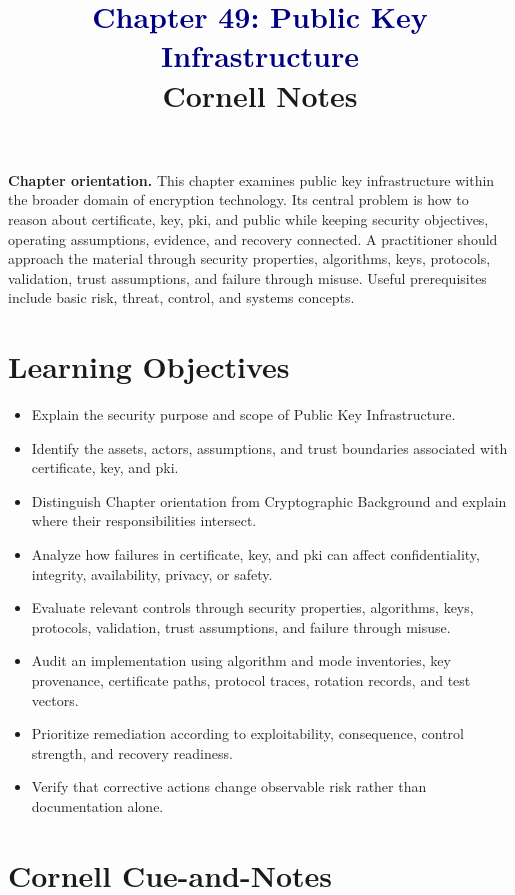 \documentclass[11pt]{article}
\title{\textcolor{Navy}{Chapter 49: Public Key Infrastructure}\\[2mm]\large Cornell Notes}
\author{}
\date{}
\begin{document}
\maketitle
\thispagestyle{fancy}
\vspace{-1.5em}
\begin{orientationbox}
\textbf{Chapter orientation.} This chapter examines public key infrastructure within the broader domain of encryption technology. Its central problem is how to reason about certificate, key, pki, and public while keeping security objectives, operating assumptions, evidence, and recovery connected. A practitioner should approach the material through security properties, algorithms, keys, protocols, validation, trust assumptions, and failure through misuse. Useful prerequisites include basic risk, threat, control, and systems concepts.
\end{orientationbox}
\section*{Learning Objectives}
\begin{itemize}
\item Explain the security purpose and scope of Public Key Infrastructure.
\item Identify the assets, actors, assumptions, and trust boundaries associated with certificate, key, and pki.
\item Distinguish Chapter orientation from Cryptographic Background and explain where their responsibilities intersect.
\item Analyze how failures in certificate, key, and pki can affect confidentiality, integrity, availability, privacy, or safety.
\item Evaluate relevant controls through security properties, algorithms, keys, protocols, validation, trust assumptions, and failure through misuse.
\item Audit an implementation using algorithm and mode inventories, key provenance, certificate paths, protocol traces, rotation records, and test vectors.
\item Prioritize remediation according to exploitability, consequence, control strength, and recovery readiness.
\item Verify that corrective actions change observable risk rather than documentation alone.
\end{itemize}
\section*{Cornell Cue-and-Notes}
\end{document}
